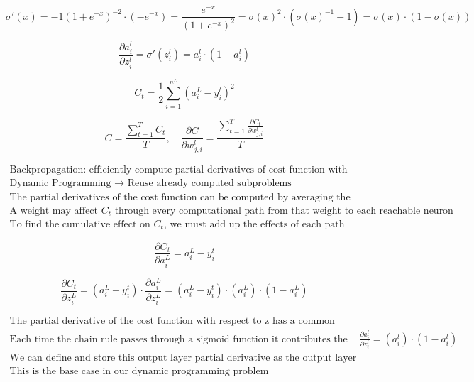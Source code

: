 \documentclass{article}
\begin{document}
\[
\sigma'(x) = -1(1+e^{-x})^{-2} \cdot (-e^{-x})=\frac{e^{-x}}{(1+e^{-x})^{2}}=\sigma(x)^{2} \cdot (\sigma(x)^{-1}-1)=\sigma(x) \cdot \left( 1-\sigma(x) \right)
\]

\[
\frac{\partial a_{i}^{l}}{\partial z_{i}^{l}}=\sigma'(z_{i}^{l})=a_{i}^{l} \cdot (1-a_{i}^{l})
\]

\[
C_{t}=\frac{1}{2}\sum_{i=1}^{n^{L}}(a_{i}^{L}-y_{i}^{t})^{2}
\]

\[
C=\frac{\sum_{t=1}^{T}C_{t}}{T}, \quad \frac{\partial C}{\partial w_{j,i}^{l}}=\frac{\sum_{t=1}^{T}\frac{\partial C_{t}}{\partial w_{j,i}^{l}}}{T}
\]

\begin{gather*}
\text{Backpropagation: efficiently compute partial derivatives of cost function with respect to each parameter} \\[0.3em]
\text{Dynamic Programming } \to \text{ Reuse already computed subproblems} \\[0.3em]
\text{The partial derivatives of the cost function can be computed by averaging the partial derivatives of each training example} \\[0.3em]
\text{A weight may affect } C_{t} \text{ through every computational path from that weight to each reachable neuron in the output layer} \\[0.3em]
\text{To find the cumulative effect on } C_{t}\text{, we must add up the effects of each path}
\end{gather*}

\[
\frac{\partial C_{t}}{\partial a_{i}^{L}}=a_{i}^{L}-y_{i}^{t}
\]

\[
\frac{\partial C_{t}}{\partial z_{i}^{L}}=(a_{i}^{L}-y_{i}^{t}) \cdot \frac{\partial a_{i}^{L}}{\partial z_{i}^{L}}=(a_{i}^{L}-y_{i}^{t}) \cdot (a_{i}^{L}) \cdot (1 - a_{i}^{L})
\]

\begin{gather*}
\text{The partial derivative of the cost function with respect to z has a common structure} \\[0.3em]
\text{Each time the chain rule passes through a sigmoid function it contributes the factor } \frac{\partial a_{i}^{l}}{\partial z_{i}^{l}}=(a_{i}^{l}) \cdot (1 - a_{i}^{l}) \\[0.3em]
\text{We can define and store this output layer partial derivative as the output layer "error"} \\[0.3em]
\text{This is the base case in our dynamic programming problem}
\end{gather*}
\end{document}
